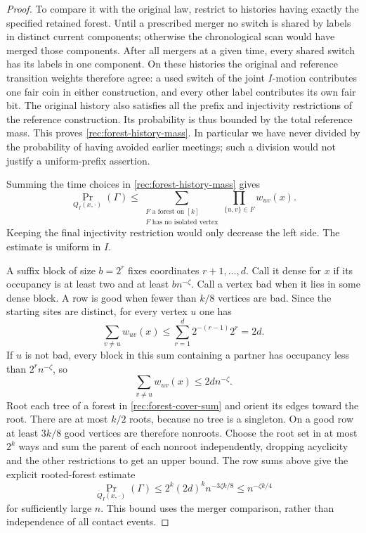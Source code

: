 \begin{proof}
To compare it with the original law, restrict to histories
having exactly the specified retained forest.  Until a
prescribed merger no switch is shared by labels in distinct
current components; otherwise the chronological scan would
have merged those components.  After all mergers at a given
time, every shared switch has its labels in one component.
On these histories the original and reference transition
weights therefore agree: a used switch of the joint
$I$-motion contributes one fair coin in either construction,
and every other label contributes its own fair bit.
The original history also satisfies all the prefix and
injectivity restrictions of the reference construction.
Its probability is thus bounded by the total reference
mass.  This proves \eqref{rec:forest-history-mass}.
In particular we have never divided by the probability of
having avoided earlier meetings; such a division would not
justify a uniform-prefix assertion.

Summing the time choices in
\eqref{rec:forest-history-mass} gives
\begin{equation}\label{rec:forest-cover-sum}
 \Pr_{Q_I(x,\cdot)}(\Gamma)
 \le\sum_{\substack{F\text{ a forest on }[k]\\
                         F\text{ has no isolated vertex}}}
                     \prod_{\{u,v\}\in F}w_{uv}(x).
\end{equation}
Keeping the final injectivity restriction would only
decrease the left side.  The estimate is uniform in $I$.

A suffix block of size $b=2^r$ fixes coordinates $r+1,\ldots,d$.
Call it dense for $x$ if its occupancy is at least two and
at least $b n^{-\zeta}$.  Call a vertex bad when it lies
in some dense block.  A row is good when fewer than $k/8$
vertices are bad.  Since the starting sites are distinct,
for every vertex $u$ one has
\[
 \sum_{v\ne u}w_{uv}(x)\le
       \sum_{r=1}^d2^{-(r-1)}2^r=2d.
\]
If $u$ is not bad, every block in this sum containing a
partner has occupancy less than $2^r n^{-\zeta}$, so
\begin{equation}\label{rec:forest-good-row-sum}
 \sum_{v\ne u}w_{uv}(x)\le2d n^{-\zeta}.
\end{equation}
Root each tree of a forest in
\eqref{rec:forest-cover-sum} and orient its edges toward
the root.  There are at most $k/2$ roots, because no tree
is a singleton.  On a good row at least $3k/8$ good
vertices are therefore nonroots.  Choose the root set
in at most $2^k$ ways and sum the parent of each nonroot
independently, dropping acyclicity and the other
restrictions to get an upper bound.  The row sums above
give the explicit rooted-forest estimate
\[
 \Pr_{Q_I(x,\cdot)}(\Gamma)
 \le2^k(2d)^k n^{-3\zeta k/8}
 \le n^{-\zeta k/4}
\]
for sufficiently large $n$.  This bound uses the merger
comparison, rather than independence of all contact events.


\end{proof}

